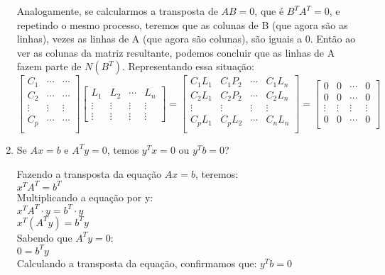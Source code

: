 \documentclass[leqno]{article}
\begin{document}
\begin{enumerate}
\begin{sol}
		Analogamente, se calcularmos a transposta de $AB = 0$, que é $B^T A^T = 0$, e repetindo o mesmo processo, teremos que as colunas de B (que agora são as linhas), vezes as linhas de A (que agora são colunas), são iguais a 0. Então ao ver as colunas da matriz resultante, podemos concluir que as linhas de A fazem parte de $N(B^T)$. Representando essa situação:\\
		$$\begin{bmatrix}
			C_1 & \cdots & \cdots \\
			C_2 & \cdots & \cdots \\
			\vdots & \vdots & \vdots \\
			C_p & \cdots & \cdots \\
		\end{bmatrix}\begin{bmatrix}
			L_1 & L_2 & \cdots & L_n \\
			\vdots & \vdots & \vdots & \vdots \\
			\vdots & \vdots & \vdots & \vdots
		\end{bmatrix} = \begin{bmatrix}
			C_1L_1 & C_1P_2 & \cdots & C_1L_n \\
			C_2L_1 & C_2P_2 & \cdots & C_2L_n \\
			\vdots & \vdots & \vdots & \vdots \\
			C_pL_1 & C_pL_2 & \cdots & C_nL_n \\
		\end{bmatrix}= \begin{bmatrix}
			0 & 0 & \cdots & 0 \\
			0 & 0 & \cdots & 0 \\
			\vdots & \vdots & \vdots & \vdots \\
			0 & 0 & \cdots & 0 \\
		\end{bmatrix}$$
		
		\end{sol} 
		
		\item Se $Ax = b$ e $A^Ty = 0$, temos $y^Tx = 0$ ou $y^Tb=0$?
		
		\begin{sol}  
			Fazendo a transposta da equação $Ax = b$, teremos:\\
			$x^T A^T = b^T$\\
			Multiplicando a equação por y:\\
			$x^T A^T \cdot y = b^T \cdot y$\\
			$x^T (A^T y) = b^T y$\\
			Sabendo que $A^Ty = 0$:\\
			$0 = b^T y$\\
			Calculando a transposta da equação, confirmamos que:
			$y^T b = 0$
		\end{sol} 
		

\end{enumerate}
\end{document}
